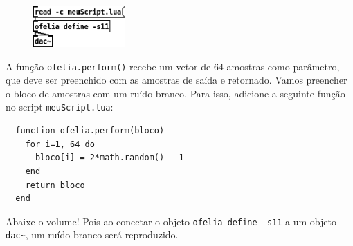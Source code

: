 \documentclass{article}
\begin{document}
\begin{figure}[H]
  \centering
  \includegraphics[width=100pt]{perform.png}
\end{figure}

A função \texttt{ofelia.perform()} recebe um vetor de 64 amostras como parâmetro, que deve ser preenchido com as amostras de saída e retornado.
Vamos preencher o bloco de amostras com um ruído branco. Para isso, adicione a seguinte função no script \texttt{meuScript.lua}:

\begin{center}
  \begin{lstlisting}
  function ofelia.perform(bloco)
    for i=1, 64 do
      bloco[i] = 2*math.random() - 1
    end
    return bloco
  end
  \end{lstlisting}
\end{center}

Abaixe o volume! Pois ao conectar o objeto \texttt{ofelia define -s11} a um objeto \texttt{dac\textasciitilde}, um ruído branco será reproduzido.




\end{document}
